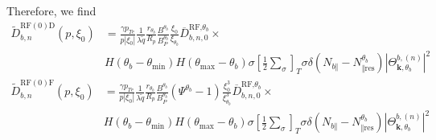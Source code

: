 Therefore, we find
\begin{align}
\widetilde{D}_{b,n}^{\text{RF}(0)\text{D}}(p,\xi_{0}) &
=\frac{\gamma p_{Te}}{p\left|  \xi_{0}\right|  }\frac{1}{\lambda\widetilde{q}%
}\frac{r_{\theta_{b}}}{R_{p}}\frac{B^{\theta_{b}}}{B_{P}^{\theta_{b}}}%
\frac{\xi_{0}}{\xi_{\theta_{b}}}\overline{D}_{b,n,0}^{\text{RF,}\theta_{b}%
}\times\label{drf0D_dke}\\
&  H\left(  \theta_{b}-\theta_{\min}\right)  H\left(  \theta_{\max}-\theta
_{b}\right)  \sigma\left[  \frac{1}{2}\sum\limits_{\sigma}\right]  _{T}%
\sigma\delta\left(  N_{b\Vert}-N_{\Vert\text{res}}^{\theta_{b}}\right)
\left|  \Theta_{\mathbf{k,}\theta_{b}}^{b,\left(  n\right)  }\right|
^{2}\nonumber
\end{align}%
\begin{align}
\widetilde{D}_{b,n}^{\text{RF}(0)\text{F}}(p,\xi_{0}) &
=\frac{\gamma p_{Te}}{p\left|  \xi_{0}\right|  }\frac{1}{\lambda\widetilde{q}%
}\frac{r_{\theta_{b}}}{R_{p}}\frac{B^{\theta_{b}}}{B_{P}^{\theta_{b}}}\left(
\Psi^{\theta_{b}}-1\right)  \frac{\xi_{0}^{3}}{\xi_{\theta_{b}}^{3}}%
\overline{D}_{b,n,0}^{\text{RF,}\theta_{b}}\times\label{drf0F_dke}\\
&  H\left(  \theta_{b}-\theta_{\min}\right)  H\left(  \theta_{\max}-\theta
_{b}\right)  \sigma\left[  \frac{1}{2}\sum\limits_{\sigma}\right]  _{T}%
\sigma\delta\left(  N_{b\Vert}-N_{\Vert\text{res}}^{\theta_{b}}\right)
\left|  \Theta_{\mathbf{k,}\theta_{b}}^{b,\left(  n\right)  }\right|
^{2}\nonumber
\end{align}
